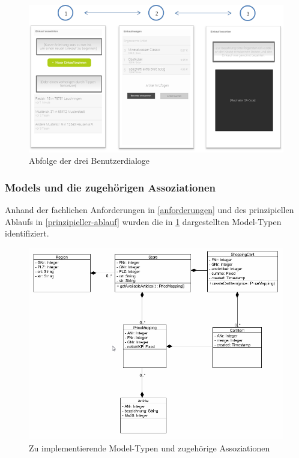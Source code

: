 \begin{figure}[H]
\includegraphics[width=\linewidth]{res/views.png}
\caption{Abfolge der drei Benutzerdialoge}
\end{figure}

\subsubsection*{Models und die zugehörigen Assoziationen}
Anhand der fachlichen Anforderungen in \ref{anforderungen} und des prinzipiellen Ablaufs in \ref{prinzipieller-ablauf} wurden die in \ref{abb:models} dargestellten Model-Typen identifiziert.

\begin{figure}[H]
\includegraphics[width=\linewidth]{res/models.png}
\caption{Zu implementierende Model-Typen und zugehörige Assoziationen}\label{abb:models}
\end{figure}

